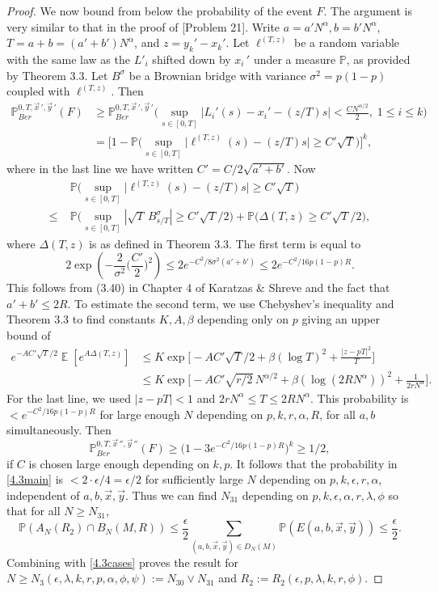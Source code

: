 \documentclass[12pt]{article}
\DeclareMathOperator{\ex}{\mathbb{E}}
\begin{document}
\begin{proof}
		We now bound from below the probability of the event $F$. The argument is very similar to that in the proof of [Problem 21]. Write $a = a'N^\alpha, b = b'N^\alpha$, $T = a+b = (a'+b')N^\alpha$, and $z = y_k' - x_k'$. Let $\ell^{(T,z)}$ be a random variable with the same law as the $L'_i$ shifted down by $x_i\,'$ under a measure $\mathbb{P}$, as provided by Theorem 3.3. Let $B^{\sigma}$ be a Brownian bridge with variance $\sigma^2 = p(1-p)$ coupled with $\ell^{(T,z)}$. Then
		\begin{align*}
		\mathbb{P}^{0,T,\vec{x}\,', \vec{y}\,'}_{Ber}(F) &\geq \mathbb{P}^{0,T,\vec{x}\,', \vec{y}\,'}_{Ber} \Big( \sup_{s\in[0,T]} \Big|L_i'(s) - x_i' - (z/T)s\Big| < \frac{CN^{\alpha/2}}{2},\; 1\leq i\leq k \Big)\\
		&= \Big[ 1 - \mathbb{P} \Big( \sup_{s\in[0,T]} \Big|\ell^{(T,z)}(s) - (z/T)s\Big| \geq C'\sqrt{T} \Big) \Big]^k,
		\end{align*}
		where in the last line we have written $C' = C/2\sqrt{a'+b'}$. Now
		\begin{align*}
		&\mathbb{P} \Big( \sup_{s\in[0,T]} \Big|\ell^{(T,z)}(s) - (z/T)s\Big| \geq C'\sqrt{T} \Big)\\
		\leq \; & \mathbb{P} \Big( \sup_{s\in[0,T]} |\sqrt{T}\,B^{\sigma}_{s/T}| \geq C'\sqrt{T}/2\Big) + \mathbb{P} \Big( \Delta(T,z) \geq C'\sqrt{T}/2 \Big),
		\end{align*}
		where $\Delta(T,z)$ is as defined in Theorem 3.3. The first term is equal to
		\[
		2\exp\left( - \frac{2}{\sigma^2}\Big(\frac{C'}{2}\Big)^2\right) \leq 2e^{-C^2/8\sigma^2(a'+b')} \leq 2e^{-C^2/16p(1-p)R}.
		\]
		This follows from (3.40) in Chapter 4 of Karatzas \& Shreve and the fact that $a'+b'\leq 2R$. To estimate the second term, we use Chebyshev's inequality and Theorem 3.3 to find constants $K,A,\beta$ depending only on $p$ giving an upper bound of
		\begin{align*}
		e^{-AC'\sqrt{T}/2}\ex[e^{A\Delta(T,z)}] &\leq K\exp\Big[-AC'\sqrt{T}/2 + \beta(\log T)^2 + \frac{|z-pT|^2}{T}\Big]\\
		&\leq K\exp\Big[ -AC'\sqrt{r/2}\,N^{\alpha/2} + \beta(\log (2RN^\alpha))^2 + \frac{1}{2rN^{\alpha}}\Big].
		\end{align*}
		For the last line, we used $|z-pT| < 1$ and $2rN^\alpha \leq T \leq 2RN^\alpha$. This probability is $< e^{-C^2/16p(1-p)R}$ for large enough $N$ depending on $p,k,r,\alpha,R$, for all $a,b$ simultaneously. Then
		\[
		\mathbb{P}^{0,T,\vec{x}\,'',\vec{y}\,''}_{Ber}(F) \geq \big(1 - 3e^{-C^2/16p(1-p)R}\big)^k \geq 1/2,
		\]
		if $C$ is chosen large enough depending on $k,p$.	It follows that the probability in \eqref{4.3main} is $< 2\cdot \epsilon/4 = \epsilon/2$ for sufficiently large $N$ depending on $p,k,\epsilon,r,\alpha$, independent of $a,b,\vec{x},\vec{y}$. Thus we can find $N_{31}$ depending on $p,k,\epsilon,\alpha,r,\lambda,\phi$ so that for all $N\geq N_{31}$,
		\[
		\mathbb{P}(A_N(R_2)\cap B_N(M,R)) \leq \frac{\epsilon}{2}\sum_{(a,b,\vec{x},\vec{y})\in D_N(M)} \mathbb{P}(E(a,b,\vec{x},\vec{y})) \leq \frac{\epsilon}{2}.
		\]
		Combining with \eqref{4.3cases} proves the result for $N\geq N_3(\epsilon,\lambda,k,r,p,\alpha,\phi,\psi) := N_{30} \vee N_{31}$ and $R_2 := R_2(\epsilon,p,\lambda,k,r,\phi)$.
		

\end{proof}
\end{document}

